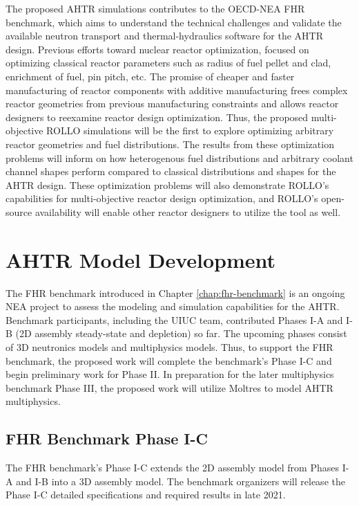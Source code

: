The proposed \gls{AHTR} simulations contributes to the \gls{OECD}-\gls{NEA}
\gls{FHR} benchmark, which aims to understand the technical challenges and validate 
the available neutron transport and thermal-hydraulics software for the \gls{AHTR}
design.
Previous efforts toward nuclear reactor optimization, focused on optimizing 
classical reactor parameters such as radius of fuel pellet and clad, enrichment 
of fuel, pin pitch, etc. 
The promise of cheaper and faster manufacturing of reactor components with 
additive manufacturing frees complex reactor geometries from previous 
manufacturing constraints and allows reactor designers to reexamine reactor 
design optimization. 
Thus, the proposed multi-objective \gls{ROLLO} simulations will be the first 
to explore optimizing arbitrary reactor geometries and fuel distributions. 
The results from these optimization problems will inform on how heterogenous 
fuel distributions and arbitrary coolant channel shapes perform compared to 
classical distributions and shapes for the \gls{AHTR} design. 
These optimization problems will also demonstrate \gls{ROLLO}'s capabilities 
for multi-objective reactor design optimization, and \gls{ROLLO}'s open-source 
availability will enable other reactor designers to utilize the tool as well. 

\section{AHTR Model Development}
The \gls{FHR} benchmark introduced in Chapter \ref{chap:fhr-benchmark} is an 
ongoing \gls{NEA} project to assess the modeling and simulation capabilities 
for the \gls{AHTR}. 
Benchmark participants, including the \gls{UIUC} team, contributed Phases I-A 
and I-B (2D assembly steady-state and depletion) so far.  
The upcoming phases consist of 3D neutronics models and multiphysics models. 
Thus, to support the \gls{FHR} benchmark, the proposed work will complete the 
benchmark's Phase I-C and begin preliminary work for Phase II.
In preparation for the later multiphysics benchmark Phase III, the proposed 
work will utilize Moltres to model \gls{AHTR} multiphysics.

\subsection{FHR Benchmark Phase I-C}
The \gls{FHR} benchmark's Phase I-C extends the 2D assembly model from Phases 
I-A and I-B into a 3D assembly model. 
The benchmark organizers will release the Phase I-C detailed specifications and 
required results in late 2021.

